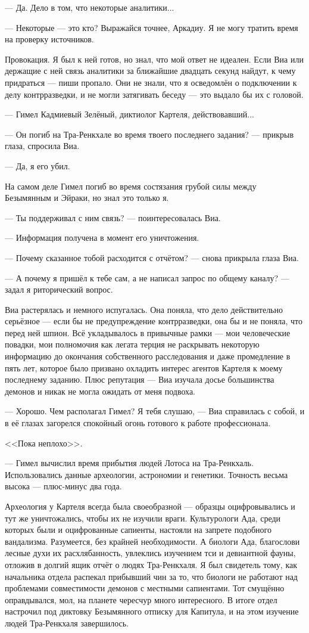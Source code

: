 --- Да.
Дело в том, что некоторые аналитики...

--- Некоторые --- это кто?
Выражайся точнее, Аркадиу.
Я не могу тратить время на проверку источников.

Провокация.
Я был к ней готов, но знал, что мой ответ не идеален.
Если Виа или держащие с ней связь аналитики за ближайшие двадцать секунд найдут, к чему придраться --- пиши пропало.
Они не знали, что я осведомлён о подключении к делу контрразведки, и не могли затягивать беседу --- это выдало бы их с головой.

--- Гимел Кадмиевый Зелёный, диктиолог Картеля, действовавший...

--- Он погиб на Тра-Ренкхале во время твоего последнего задания? --- прикрыв глаза, спросила Виа.

--- Да, я его убил.

На самом деле Гимел погиб во время состязания грубой силы между Безымянным и Эйраки, но знал это только я.

--- Ты поддерживал с ним связь? --- поинтересовалась Виа.

--- Информация получена в момент его уничтожения.

--- Почему сказанное тобой расходится с отчётом? --- снова прикрыла глаза Виа.

--- А почему я пришёл к тебе сам, а не написал запрос по общему каналу? --- задал я риторический вопрос.

Виа растерялась и немного испугалась.
Она поняла, что дело действительно серьёзное --- если бы не предупреждение контрразведки, она бы и не поняла, что перед ней шпион.
Всё укладывалось в привычные рамки --- мои человеческие повадки, мои полномочия как легата терция не раскрывать некоторую информацию до окончания собственного расследования и даже промедление в пять лет, которое было призвано охладить интерес агентов Картеля к моему последнему заданию.
Плюс репутация --- Виа изучала досье большинства демонов и никак не могла ожидать от меня подвоха.

--- Хорошо.
Чем располагал Гимел?
Я тебя слушаю, --- Виа справилась с собой, и в её глазах загорелся спокойный огонь готового к работе профессионала.

<<Пока неплохо>>.

--- Гимел вычислил время прибытия людей Лотоса на Тра-Ренкхаль.
Использовались данные археологии, астрономии и генетики.
Точность весьма высока --- плюс-минус два года.

Археология у Картеля всегда была своеобразной --- образцы оцифровывались и тут же уничтожались, чтобы их не изучили враги.
Культурологи Ада, среди которых были и оцифрованные сапиенты, настояли на запрете подобного вандализма.
Разумеется, без крайней необходимости.
А биологи Ада, благослови лесные духи их расхлябанность, увлеклись изучением тси и девиантной фауны, отложив в долгий ящик отчёт о людях Тра-Ренкхаля.
Я был свидетель тому, как начальника отдела распекал прибывший чин за то, что биологи не работают над проблемами совместимости демонов с местными сапиентами.
Тот смущённо оправдывался, мол, на планете чересчур много интересного.
В итоге отдел настрочил под диктовку Безымянного отписку для Капитула, и на этом изучение людей Тра-Ренкхаля завершилось.

